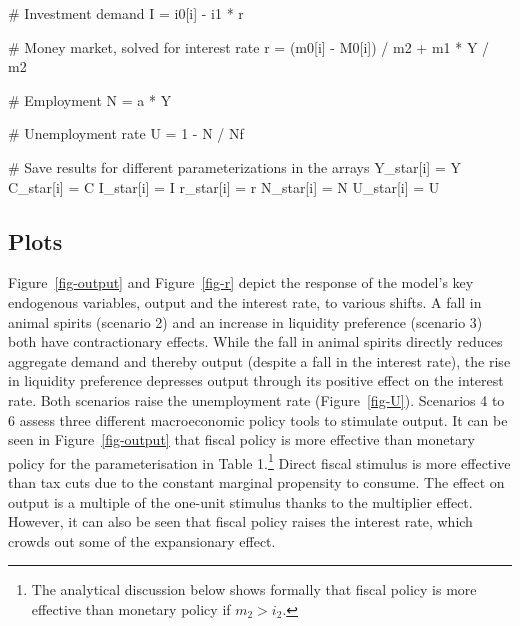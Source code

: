 \documentclass[
  letterpaper,
  DIV=11,
  numbers=noendperiod]{scrreprt}
\newenvironment{Shaded}{\begin{snugshade}}{\end{snugshade}}
\newcommand{\CommentTok}[1]{\textcolor[rgb]{0.37,0.37,0.37}{#1}}
\newcommand{\DecValTok}[1]{\textcolor[rgb]{0.68,0.00,0.00}{#1}}
\newcommand{\NormalTok}[1]{\textcolor[rgb]{0.00,0.23,0.31}{#1}}
\newcommand{\OperatorTok}[1]{\textcolor[rgb]{0.37,0.37,0.37}{#1}}
\begin{document}
\begin{tcolorbox}
\begin{Shaded}
\begin{Highlighting}[]
        \CommentTok{\# Investment demand}
\NormalTok{        I }\OperatorTok{=}\NormalTok{ i0[i] }\OperatorTok{{-}}\NormalTok{ i1 }\OperatorTok{*}\NormalTok{ r}

        \CommentTok{\# Money market, solved for interest rate}
\NormalTok{        r }\OperatorTok{=}\NormalTok{ (m0[i] }\OperatorTok{{-}}\NormalTok{ M0[i]) }\OperatorTok{/}\NormalTok{ m2 }\OperatorTok{+}\NormalTok{ m1 }\OperatorTok{*}\NormalTok{ Y }\OperatorTok{/}\NormalTok{ m2}

        \CommentTok{\# Employment}
\NormalTok{        N }\OperatorTok{=}\NormalTok{ a }\OperatorTok{*}\NormalTok{ Y}

        \CommentTok{\# Unemployment rate}
\NormalTok{        U }\OperatorTok{=} \DecValTok{1} \OperatorTok{{-}}\NormalTok{ N }\OperatorTok{/}\NormalTok{ Nf}

    \CommentTok{\# Save results for different parameterizations in the arrays}
\NormalTok{    Y\_star[i] }\OperatorTok{=}\NormalTok{ Y}
\NormalTok{    C\_star[i] }\OperatorTok{=}\NormalTok{ C}
\NormalTok{    I\_star[i] }\OperatorTok{=}\NormalTok{ I}
\NormalTok{    r\_star[i] }\OperatorTok{=}\NormalTok{ r}
\NormalTok{    N\_star[i] }\OperatorTok{=}\NormalTok{ N}
\NormalTok{    U\_star[i] }\OperatorTok{=}\NormalTok{ U}
    
\end{Highlighting}
\end{Shaded}

\end{tcolorbox}

\subsection{Plots}\label{plots-1}

Figure~\ref{fig-output} and Figure~\ref{fig-r} depict the response of
the model's key endogenous variables, output and the interest rate, to
various shifts. A fall in animal spirits (scenario 2) and an increase in
liquidity preference (scenario 3) both have contractionary effects.
While the fall in animal spirits directly reduces aggregate demand and
thereby output (despite a fall in the interest rate), the rise in
liquidity preference depresses output through its positive effect on the
interest rate. Both scenarios raise the unemployment rate
(Figure~\ref{fig-U}). Scenarios 4 to 6 assess three different
macroeconomic policy tools to stimulate output. It can be seen in
Figure~\ref{fig-output} that fiscal policy is more effective than
monetary policy for the parameterisation in Table 1.\footnote{The
  analytical discussion below shows formally that fiscal policy is more
  effective than monetary policy if \(m_{2}>i_{2}\).} Direct fiscal
stimulus is more effective than tax cuts due to the constant marginal
propensity to consume. The effect on output is a multiple of the
one-unit stimulus thanks to the multiplier effect. However, it can also
be seen that fiscal policy raises the interest rate, which crowds out
some of the expansionary effect.
\end{document}
